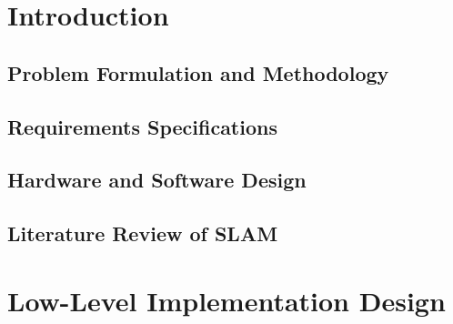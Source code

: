 \documentclass[a4paper, 11pt, twoside]{report}
\begin{document}
\pagestyle{}


%


\chapter{Introduction}


\section{Problem Formulation and Methodology}


\section{Requirements Specifications}


\section{Hardware and Software Design}


\section{Literature Review of SLAM}

\newpage

%
%


\chapter{Low-Level Implementation Design}

\end{document}
